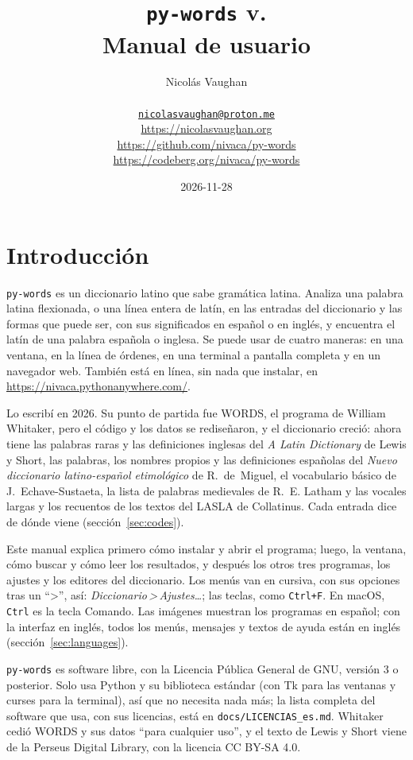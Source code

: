 \documentclass[12pt,
              article,
              oneside
              ]{memoir}
\title{\bfseries%
  \texttt{py-words} v.\version{} \\
  Manual de usuario}
\author{%
  Nicolás Vaughan\\
  \begin{minipage}[t]{0.8\linewidth}
    \centering\small%
    \href{mailto:nicolasvaughan@proton.me}{\texttt{nicolasvaughan@proton.me}}\\
    \url{https://nicolasvaughan.org}\\
    \url{https://github.com/nivaca/py-words}\\
    \url{https://codeberg.org/nivaca/py-words}\\
  \end{minipage}}
\date{2026-11-28}
\newcommand*{\menu}[1]{\textit{#1}}
\newcommand*{\then}{\,>\,}
\newcommand*{\key}[1]{\texttt{#1}}
\begin{document}
\maketitle

\tableofcontents*

\section{Introducción}
\noindent
\texttt{py-words} es un diccionario latino que sabe gramática latina.
Analiza una palabra latina flexionada, o una línea entera de latín, en las
entradas del diccionario y las formas que puede ser, con sus significados
en español o en inglés, y encuentra el latín de una palabra española o
inglesa. Se puede usar de cuatro maneras: en una ventana, en la línea de
órdenes, en una terminal a pantalla completa y en un navegador web.
También está en línea, sin nada que instalar, en
\url{https://nivaca.pythonanywhere.com/}.

%
Lo escribí en 2026. Su punto de partida fue WORDS, el programa de William
Whitaker, pero el código y los datos se rediseñaron, y el diccionario
creció: ahora tiene las palabras raras y las definiciones inglesas del
\textit{A Latin Dictionary} de Lewis y Short, las palabras, los nombres
propios y las definiciones españolas del \textit{Nuevo diccionario
latino-español etimológico} de R.~de~Miguel, el vocabulario básico de
J.~Echave-Sustaeta, la lista de palabras medievales de R.~E. Latham y las
vocales largas y los recuentos de los textos del LASLA de Collatinus.
Cada entrada dice de dónde viene
(sección~\ref{sec:codes}).

%
Este manual explica primero cómo instalar y abrir el programa; luego, la
ventana, cómo buscar y cómo leer los resultados, y después los otros tres
programas, los ajustes y los editores del diccionario. Los menús van en
cursiva, con sus opciones tras un \enquote{>}, así:
\menu{Diccionario\then Ajustes\ldots}; las teclas, como \key{Ctrl+F}. En
macOS, \key{Ctrl} es la tecla Comando. Las imágenes muestran los programas
en español; con la interfaz en inglés, todos los menús, mensajes y textos
de ayuda están en inglés (sección~\ref{sec:languages}).

%
\texttt{py-words} es software libre, con la Licencia Pública General de
GNU, versión 3 o posterior. Solo usa Python y su biblioteca estándar (con
Tk para las ventanas y curses para la terminal), así que no necesita nada
más; la lista completa del software que usa, con sus licencias, está en
\texttt{docs/LICENCIAS\_es.md}. Whitaker cedió WORDS y sus datos
\enquote{para cualquier uso}, y el texto de Lewis y Short viene de la
Perseus Digital Library, con la licencia CC BY-SA 4.0.
\end{document}
